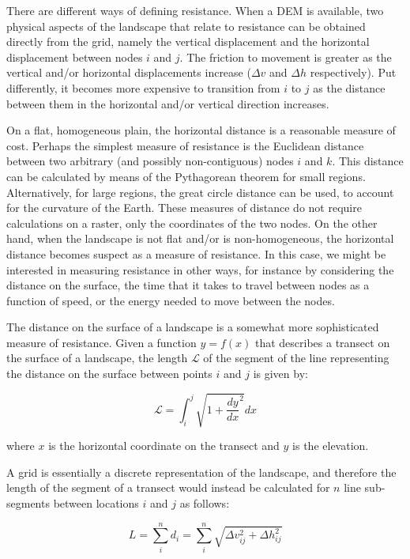\documentclass[]{elsarticle} %
\begin{document}
There are different ways of defining resistance. When a DEM is
available, two physical aspects of the landscape that relate to
resistance can be obtained directly from the grid, namely the vertical
displacement and the horizontal displacement between nodes \(i\) and
\(j\). The friction to movement is greater as the vertical and/or
horizontal displacements increase (\(\Delta v\) and \(\Delta h\)
respectively). Put differently, it becomes more expensive to transition
from \(i\) to \(j\) as the distance between them in the horizontal
and/or vertical direction increases.

On a flat, homogeneous plain, the horizontal distance is a reasonable
measure of cost. Perhaps the simplest measure of resistance is the
Euclidean distance between two arbitrary (and possibly non-contiguous)
nodes \(i\) and \(k\). This distance can be calculated by means of the
Pythagorean theorem for small regions. Alternatively, for large regions,
the great circle distance can be used, to account for the curvature of
the Earth. These measures of distance do not require calculations on a
raster, only the coordinates of the two nodes. On the other hand, when
the landscape is not flat and/or is non-homogeneous, the horizontal
distance becomes suspect as a measure of resistance. In this case, we
might be interested in measuring resistance in other ways, for instance
by considering the distance on the surface, the time that it takes to
travel between nodes as a function of speed, or the energy needed to
move between the nodes.

The distance on the surface of a landscape is a somewhat more
sophisticated measure of resistance. Given a function \(y=f(x)\) that
describes a transect on the surface of a landscape, the length
\(\mathcal{L}\) of the segment of the line representing the distance on
the surface between points \(i\) and \(j\) is given by:

\begin{equation} \label{eq:1}\mathcal{L} = \int_{i}^{j}{\sqrt{1 + \frac{dy}{dx}^2}}dx\end{equation}

\noindent where \(x\) is the horizontal coordinate on the transect and
\(y\) is the elevation.

A grid is essentially a discrete representation of the landscape, and
therefore the length of the segment of a transect would instead be
calculated for \(n\) line sub-segments between locations \(i\) and \(j\)
as follows:

\begin{equation} \label{eq:2}L = \sum_{i}^{n}{d_i} = \sum_{i}^{n}{\sqrt{\Delta v_{ij}^2 + \Delta h_{ij}^2}}\end{equation}
\end{document}
